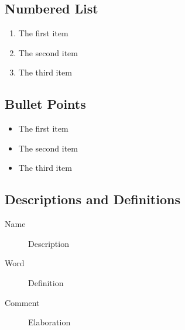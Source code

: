 \subsection{Numbered List}

\begin{enumerate}
\item The first item
\item The second item
\item The third item
\end{enumerate}

\subsection{Bullet Points}

\begin{itemize}
\item The first item
\item The second item
\item The third item
\end{itemize}

\subsection{Descriptions and Definitions}

\begin{description}
\item[Name] Description
\item[Word] Definition
\item[Comment] Elaboration
\end{description}
